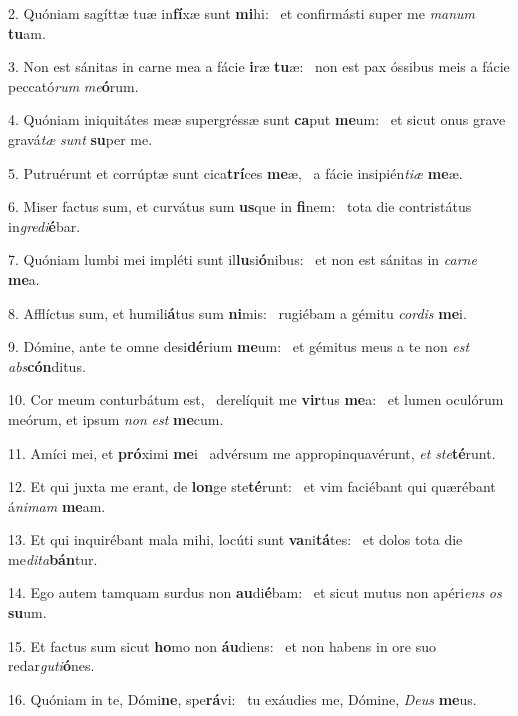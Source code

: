 2. Quóniam sagíttæ tuæ in\textbf{fí}xæ sunt \textbf{mi}hi: \ast\  et confirmásti super me \textit{ma}\textit{num} \textbf{tu}am.\

3. Non est sánitas in carne mea a fácie \textbf{i}ræ \textbf{tu}æ: \ast\  non est pax óssibus meis a fácie peccató\textit{rum} \textit{me}\textbf{ó}rum.\

4. Quóniam iniquitátes meæ supergréssæ sunt \textbf{ca}put \textbf{me}um: \ast\  et sicut onus grave gravá\textit{tæ} \textit{sunt} \textbf{su}per me.\

5. Putruérunt et corrúptæ sunt cica\textbf{trí}ces \textbf{me}æ, \ast\  a fácie insipién\textit{ti}\textit{æ} \textbf{me}æ.\

6. Miser factus sum, et curvátus sum \textbf{us}que in \textbf{fi}nem: \ast\  tota die contristátus in\textit{gre}\textit{di}\textbf{é}bar.\

7. Quóniam lumbi mei impléti sunt il\textbf{lu}si\textbf{ó}nibus: \ast\  et non est sánitas in \textit{car}\textit{ne} \textbf{me}a.\

8. Afflíctus sum, et humili\textbf{á}tus sum \textbf{ni}mis: \ast\  rugiébam a gémitu \textit{cor}\textit{dis} \textbf{me}i.\

9. Dómine, ante te omne desi\textbf{dé}rium \textbf{me}um: \ast\  et gémitus meus a te non \textit{est} \textit{abs}\textbf{cón}ditus.\

10. Cor meum conturbátum est, \dag\  derelíquit me \textbf{vir}tus \textbf{me}a: \ast\  et lumen oculórum meórum, et ipsum \textit{non} \textit{est} \textbf{me}cum.\

11. Amíci mei, et \textbf{pró}ximi \textbf{me}i \ast\  advérsum me appropinquavérunt, \textit{et} \textit{ste}\textbf{té}runt.\

12. Et qui juxta me erant, de \textbf{lon}ge ste\textbf{té}runt: \ast\  et vim faciébant qui quærébant á\textit{ni}\textit{mam} \textbf{me}am.\

13. Et qui inquirébant mala mihi, locúti sunt \textbf{va}ni\textbf{tá}tes: \ast\  et dolos tota die me\textit{di}\textit{ta}\textbf{bán}tur.\

14. Ego autem tamquam surdus non \textbf{au}di\textbf{é}bam: \ast\  et sicut mutus non apéri\textit{ens} \textit{os} \textbf{su}um.\

15. Et factus sum sicut \textbf{ho}mo non \textbf{áu}diens: \ast\  et non habens in ore suo redar\textit{gu}\textit{ti}\textbf{ó}nes.\

16. Quóniam in te, Dómi\textbf{ne}, spe\textbf{rá}vi: \ast\  tu exáudies me, Dómine, \textit{De}\textit{us} \textbf{me}us.\

